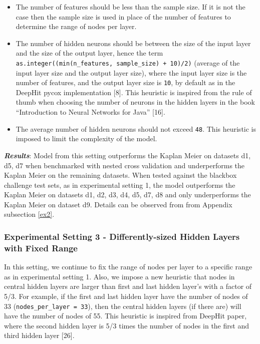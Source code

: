 \documentclass[
]{article}
\providecommand{\tightlist}{%
  \setlength{\itemsep}{0pt}\setlength{\parskip}{0pt}}
\begin{document}
\begin{itemize}
\tightlist
\item
  The number of features should be less than the sample size. If it is not the case then the sample size is used in place of the number of features to determine the range of nodes per layer.
\item
  The number of hidden neurons should be between the size of the input layer and the size of the output layer, hence the term \texttt{as.integer((min(n\_features,\ sample\_size)\ +\ 10)/2)} (average of the input layer size and the output layer size), where the input layer size is the number of features, and the output layer size is \texttt{10}, by default as in the DeepHit pycox implementation {[}8{]}. This heuristic is inspired from the rule of thumb when choosing the number of neurons in the hidden layers in the book ``Introduction to Neural Networks for Java'' {[}16{]}.
\item
  The average number of hidden neurons should not exceed \texttt{48}. This heuristic is imposed to limit the complexity of the model.
\end{itemize}

\textbf{\emph{Results}}: Model from this setting outperforms the Kaplan Meier on datasets d1, d5, d7 when benchmarked with nested cross validation and underperforms the Kaplan Meier on the remaining datasets. When tested against the blackbox challenge test sets, as in experimental setting 1, the model outperforms the Kaplan Meier on datasets d1, d2, d3, d4, d5, d7, d8 and only underperforms the Kaplan Meier on dataset d9. Details can be observed from from Appendix subsection \ref{ex2}.

\hypertarget{experimental-setting-3---differently-sized-hidden-layers-with-fixed-range}{%
\subsubsection{Experimental Setting 3 - Differently-sized Hidden Layers with Fixed Range}\label{experimental-setting-3---differently-sized-hidden-layers-with-fixed-range}}

In this setting, we continue to fix the range of nodes per layer to a specific range as in experimental setting 1. Also, we impose a new heuristic that nodes in central hidden layers are larger than first and last hidden layer's with a factor of 5/3. For example, if the first and last hidden layer have the number of nodes of 33 (\texttt{nodes\_per\_layer\ =\ 33}), then the central hidden layers (if there are) will have the number of nodes of 55. This heuristic is inspired from DeepHit paper, where the second hidden layer is 5/3 times the number of nodes in the first and third hidden layer {[}26{]}.
\end{document}
